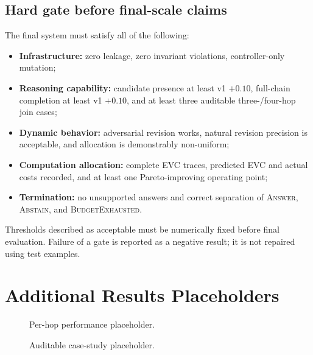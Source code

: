 \subsection{Hard gate before final-scale claims}

The final system must satisfy all of the following:
\begin{itemize}[leftmargin=*]
  \item \textbf{Infrastructure:} zero leakage, zero invariant violations, controller-only mutation;
  \item \textbf{Reasoning capability:} candidate presence at least v1 $+0.10$, full-chain completion at least v1 $+0.10$, and at least three auditable three-/four-hop join cases;
  \item \textbf{Dynamic behavior:} adversarial revision works, natural revision precision is acceptable, and allocation is demonstrably non-uniform;
  \item \textbf{Computation allocation:} complete EVC traces, predicted EVC and actual costs recorded, and at least one Pareto-improving operating point;
  \item \textbf{Termination:} no unsupported answers and correct separation of \textsc{Answer}, \textsc{Abstain}, and \textsc{BudgetExhausted}.
\end{itemize}
Thresholds described as acceptable must be numerically fixed before final evaluation. Failure of a gate is reported as a negative result; it is not repaired using test examples.

\section{Additional Results Placeholders}

\begin{figure}[h]
\centering
{}
\caption{Per-hop performance placeholder.}
\label{fig:perhop}
\end{figure}

\begin{figure}[h]
\centering
{}
\caption{Auditable case-study placeholder.}
\label{fig:case}
\end{figure}

